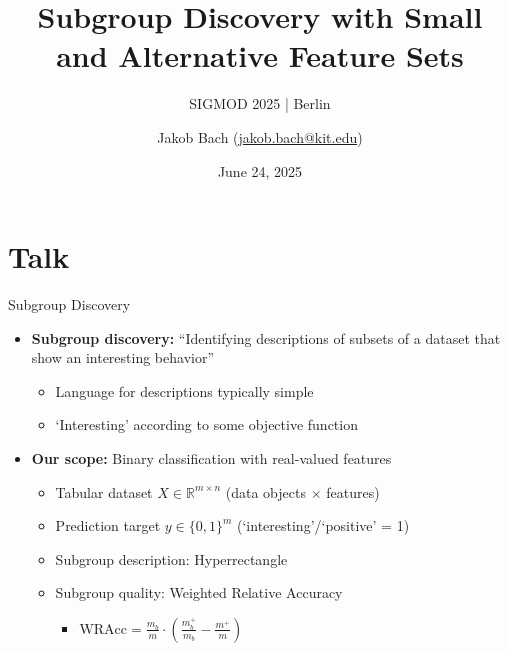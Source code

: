 \documentclass[en, navbaroff]{sdqbeamer}
\title[Subgroup Discovery with Small and Alternative Feature Sets]{Subgroup Discovery with Small and Alternative Feature Sets} %
\subtitle{SIGMOD 2025 | Berlin}
\author[Jakob Bach]{Jakob Bach (\href{mailto:jakob.bach@kit.edu}{jakob.bach@kit.edu})} %
\date[2025-06-24]{June 24, 2025} %
\begin{document}
\begin{frame}[title white horizontal, picture=plots/title_image, kitlogo=rgb]
	\titlepage
\end{frame}

\section{Talk}

\begin{frame}[t]{Subgroup Discovery}
	\begin{itemize}
		\item \textbf{Subgroup discovery:} ``Identifying descriptions of subsets of a dataset that show an interesting behavior''~\cite{atzmueller2015subgroup}
		\begin{itemize}
			\item Language for descriptions typically simple
			\item `Interesting' according to some objective function
		\end{itemize}
		\pause
		\vspace{\baselineskip}
		\item \textbf{Our scope:} Binary classification with real-valued features
		\begin{itemize}
			\item Tabular dataset $X \in \mathbb{R}^{m \times n}$ (data objects $\times$ features)
			\item Prediction target $y \in \{0, 1\}^m$ (`interesting'/`positive' = 1)
			\item Subgroup description: Hyperrectangle
			\item Subgroup quality: Weighted Relative Accuracy
			\begin{itemize}
				\item $\text{WRAcc} = \frac{m_b}{m} \cdot \left( \frac{m_b^+}{m_b} - \frac{m^+}{m} \right)$~\cite{lavravc1999rule}

\end{itemize}
\end{itemize}
\end{itemize}
\end{frame}
\end{document}
